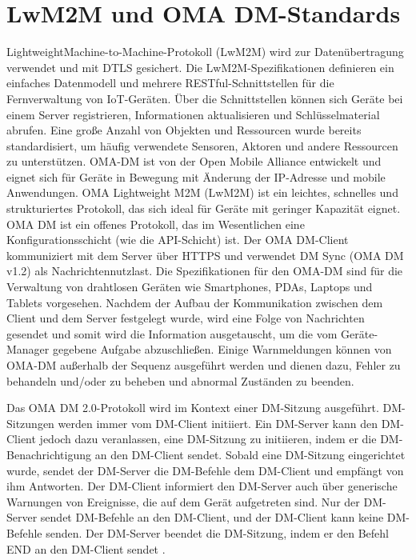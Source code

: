 \section{LwM2M und OMA DM-Standards}
\label{sec:ota:oma-dm}
LightweightMachine-to-Machine-Protokoll (LwM2M) wird zur Datenübertragung verwendet und mit DTLS gesichert. Die LwM2M-Spezifikationen definieren ein einfaches Datenmodell und mehrere RESTful-Schnittstellen für die Fernverwaltung von IoT-Geräten. Über die Schnittstellen können sich Geräte bei einem Server registrieren, Informationen aktualisieren und Schlüsselmaterial abrufen. Eine große Anzahl von Objekten und Ressourcen wurde bereits standardisiert, um häufig verwendete Sensoren, Aktoren und andere Ressourcen zu unterstützen. OMA-DM ist von der Open Mobile Alliance entwickelt und eignet sich für Geräte in Bewegung mit Änderung der IP-Adresse und mobile Anwendungen. OMA Lightweight M2M (LwM2M) ist ein leichtes, schnelles und strukturiertes Protokoll, das sich ideal für Geräte mit geringer Kapazität eignet. OMA DM ist ein offenes Protokoll, das im Wesentlichen eine Konfigurationsschicht (wie die API-Schicht) ist. Der OMA DM-Client kommuniziert mit dem Server über HTTPS und verwendet DM Sync (OMA DM v1.2) als Nachrichtennutzlast. Die Spezifikationen für den OMA-DM sind für die Verwaltung von drahtlosen Geräten wie Smartphones, PDAs, Laptops und Tablets vorgesehen. Nachdem der Aufbau der Kommunikation zwischen dem Client und dem Server festgelegt wurde, wird eine Folge von Nachrichten gesendet und somit wird die Information ausgetauscht, um die vom Geräte-Manager gegebene Aufgabe abzuschließen. Einige Warnmeldungen können von OMA-DM außerhalb der Sequenz ausgeführt werden und dienen dazu, Fehler zu behandeln und/oder zu beheben und abnormal Zuständen zu beenden.

Das OMA DM 2.0-Protokoll wird im Kontext einer DM-Sitzung ausgeführt. DM-Sitzungen werden immer vom DM-Client initiiert. Ein DM-Server kann den DM-Client jedoch dazu veranlassen, eine DM-Sitzung zu initiieren, indem er die DM-Benachrichtigung an den DM-Client sendet. Sobald eine DM-Sitzung eingerichtet wurde, sendet der DM-Server die DM-Befehle dem DM-Client und empfängt von ihm Antworten. Der DM-Client informiert den DM-Server auch über generische Warnungen von Ereignisse, die auf dem Gerät aufgetreten sind. Nur der DM-Server sendet DM-Befehle an den DM-Client, und der DM-Client kann keine DM-Befehle senden. Der DM-Server beendet die DM-Sitzung, indem er den Befehl END an den DM-Client sendet \cite[p.13]{website:OMADM}.

